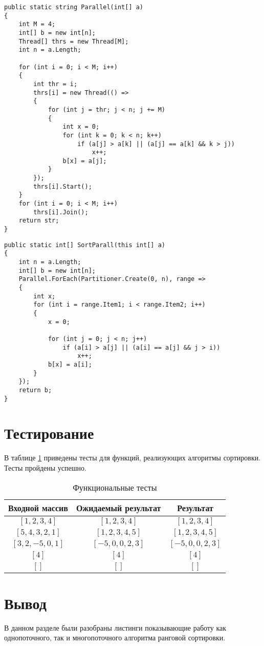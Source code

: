 \begin{lstlisting}[label=lst:mnog,caption=Алгоритм ранговой сортировки (многопоточный)]
public static string Parallel(int[] a)
{
	int M = 4;
	int[] b = new int[n];
	Thread[] thrs = new Thread[M];
	int n = a.Length;

	for (int i = 0; i < M; i++)
	{
		int thr = i;
		thrs[i] = new Thread(() =>
		{
			for (int j = thr; j < n; j += M)
			{
				int x = 0;
				for (int k = 0; k < n; k++)
					if (a[j] > a[k] || (a[j] == a[k] && k > j))
						x++;
				b[x] = a[j];
			}
		});
		thrs[i].Start();
	}
	for (int i = 0; i < M; i++) 
		thrs[i].Join();
	return str;
}
\end{lstlisting}

\begin{lstlisting}[label=lst:dop,caption=Алгоритм ранговой сортировки (многопоточной с помощью специального метода)]
public static int[] SortParall(this int[] a)
{
	int n = a.Length;
	int[] b = new int[n];
	Parallel.ForEach(Partitioner.Create(0, n), range =>
	{
		int x;
		for (int i = range.Item1; i < range.Item2; i++)
		{
			x = 0;
			
			for (int j = 0; j < n; j++)
				if (a[i] > a[j] || (a[i] == a[j] && j > i))
					x++;
			b[x] = a[i]; 
		}
	});
	return b;
}
\end{lstlisting}

\captionsetup{singlelinecheck = false, justification=centering}

\section{Тестирование}

В таблице \ref{tbl:functional_test} приведены тесты для функций, реализующих алгоритмы сортировки. Тесты пройдены успешно.

\clearpage
\begin{table}[h]
	\begin{center}
	\caption{\label{tbl:functional_test} Функциональные тесты}
		\begin{tabular}{|c|c|c|}
			\hline
			Входной массив & Ожидаемый результат & Результат \\ 
			\hline
			$[1,2,3,4]$ & $[1,2,3,4]$  & $[1,2,3,4]$\\
			$[5,4,3,2,1]$  & $[1,2,3,4,5]$ & $[1,2,3,4,5]$\\
			$[3,2,-5,0,1]$  & $[-5,0,0,2,3]$  & $[-5,0,0,2,3]$\\
			$[4]$  & $[4]$  & $[4]$\\
			$[]$  & $[]$  & $[]$\\
			\hline
		\end{tabular}
	\end{center}
\end{table}


\section*{Вывод}
В данном разделе были разобраны листинги  показывающие
работу как однопоточного, так и многопоточного алгоритма ранговой сортировки.
